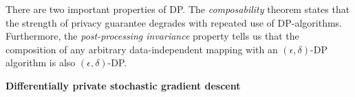 \documentclass{article}
\begin{document}

There are two important properties of DP.
The \textit{composability} theorem \cite{dwork2006our} states that the strength of privacy guarantee degrades with repeated use of DP-algorithms. 
Furthermore,  the \textit{post-processing invariance} property \citep{dwork2006our} tells us that the composition of any arbitrary data-independent mapping with an $(\epsilon,\delta)$-DP algorithm is also $(\epsilon,\delta)$-DP. 

 
\textbf{Differentially private stochastic gradient descent}
\end{document}
